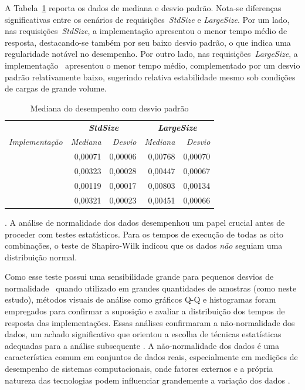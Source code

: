 A Tabela~\ref{tab:mediadesempenho} reporta os dados de mediana e desvio padrão. 
%
Nota-se diferenças significativas entre os cenários de requisições~\textit{StdSize} e \textit{LargeSize}. Por um lado, nas requisições~\textit{StdSize}, a implementação \gogrpc{} apresentou o menor tempo médio de resposta, destacando-se também por seu baixo desvio padrão, o que indica uma regularidade notável no desempenho. 
%
Por outro lado, nas requisições~\textit{LargeSize}, a implementação~\gorest{} apresentou o menor tempo médio, complementado por um desvio padrão relativamente baixo, sugerindo relativa estabilidade mesmo sob condições de cargas de grande volume.

\begin{table}[!ht]
\small
\centering
\caption{Mediana do desempenho com desvio padrão}
\label{tab:mediadesempenho}
\begin{tabular}{lrrrr}
& \multicolumn{2}{c}{\textbf{\em StdSize}} & \multicolumn{2}{c}{\textbf{\em LargeSize}} \\
\textit{Implementação} & \textit{Mediana} & \textit{Desvio} & \textit{Mediana} & \textit{Desvio} \\
\gogrpc{} & 0,00071 & 0,00006 &  0,00768 & 0,00070\\
\gorest{} & 0,00323 & 0,00028 & 0,00447 & 0,00067\\
\javagrpc{} & 0,00119 & 0,00017 & 0,00803 & 0,00134\\
\javarest{} & 0,00321 & 0,00023 & 0,00451 & 0,00066

\end{tabular}
\end{table}

. A análise de normalidade dos dados desempenhou um papel crucial antes de proceder com testes estatísticos. Para os tempos de execução de todas as oito combinações, 
o teste de Shapiro-Wilk indicou que os dados {\em não} seguiam uma distribuição normal.

Como esse teste possui uma sensibilidade grande para pequenos desvios de normalidade~\cite{miot_2017}
quando utilizado em grandes quantidades de amostras (como neste estudo), métodos visuais de análise como gráficos Q-Q e histogramas foram empregados para confirmar a suposição e avaliar a distribuição dos tempos de resposta das implementações. Essas análises confirmaram a não-normalidade dos dados, um achado significativo que orientou a escolha de técnicas estatísticas adequadas para a análise subsequente \cite{Habibzadeh2024}. A não-normalidade dos dados é uma característica comum em conjuntos de dados reais, especialmente em medições de desempenho de sistemas computacionais, onde fatores externos e a própria natureza das tecnologias podem influenciar grandemente a variação dos dados \cite{Holovnia2023}.

